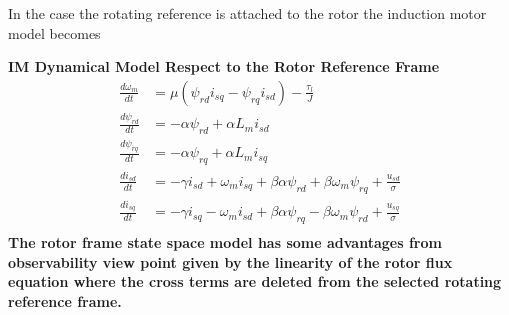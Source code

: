 \documentclass[11pt,a4paper]{scrartcl}
\numberwithin{equation}{section}
\theoremstyle{it}
\theoremstyle{definition}
\begin{document}
\begin{onehalfspace}
In the case the rotating reference is attached to the rotor the induction motor 
model becomes
\begin{mybox}
	\textbf{IM Dynamical Model Respect to the Rotor Reference Frame}
	\begin{equation}\label{im_eq_43}
		\begin{aligned}
			\frac{d\omega_m}{dt} &= \mu \left(\psi_{rd}i_{sq} - 
			\psi_{rq}i_{sd}\right)-\frac{\tau_l}{J} \\[6pt]
			\frac{d\psi_{rd}}{dt} &= -\alpha \psi_{rd} + \alpha L_m i_{sd} 
			\\[6pt]
			\frac{d\psi_{rq}}{dt} &= -\alpha \psi_{rq} + \alpha L_m i_{sq} 
			\\[6pt]
			\frac{di_{sd}}{dt} &= -\gamma i_{sd}  + \omega_m i_{sq} + 
			\beta\alpha\psi_{rd}+\beta\omega_m\psi_{rq} + \frac{u_{sd}}{\sigma} 
			\\[6pt]
			\frac{di_{sq}}{dt} &= -\gamma i_{sq}  - \omega_m i_{sd} + 
			\beta\alpha\psi_{rq}-\beta\omega_m\psi_{rd} + \frac{u_{sq}}{\sigma} 
			\\[6pt]
		\end{aligned}
	\end{equation}
	\textbf{The rotor frame state space model has some advantages from 
		observability view point given by the linearity of the rotor flux 
		equation 
		where the cross terms are deleted from the selected rotating reference 
		frame.}
\end{mybox}


\end{onehalfspace}
\end{document}
